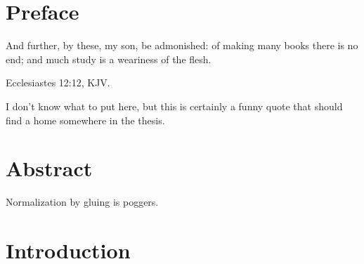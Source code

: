 \documentclass[12pt,twoside]{reedthesis}
\theoremstyle{definition}
\theoremstyle{remark}
\theoremstyle{plain}
\begin{document}
\chapter*{Preface}
\epigraph{And further, by these, my son, be admonished: of making many books
  there is no end; and much study is a weariness of the flesh.}{Ecclesiastes
  12:12, KJV.}

I don't know what to put here, but this is certainly a funny quote that should
find a home somewhere in the thesis.



\tableofcontents
\listoftables
\listoffigures

\chapter*{Abstract}
Normalization by gluing is poggers.



\mainmatter%
\pagestyle{fancyplain} %


\chapter*{Introduction}
\end{document}
